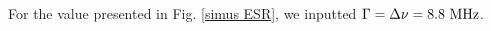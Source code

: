 \documentclass[a4paper,11pt]{report}
\begin{document}
For the value presented in Fig. \ref{simus ESR}, we inputted $\Gamma=\Delta \nu=8.8\ \rm MHz$.
%
%
%
%
\end{document}
